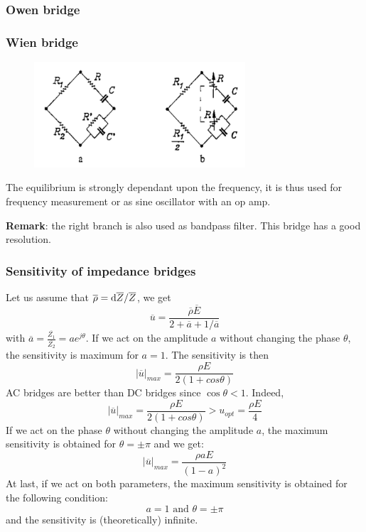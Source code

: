 \subsubsection{Owen bridge}

\subsubsection{Wien bridge}


\begin{minipage}[c]{0.45 \linewidth}
\begin{figure}[H]
    \centering
    \includegraphics[width = 0.7\textwidth]{L4/img/wien-bridge.PNG}
\end{figure}
\end{minipage}\hfill
\begin{minipage}[c]{0.45 \linewidth}
    The equilibrium is strongly dependant upon the frequency, it is thus used for frequency measurement or as sine oscillator with an op amp.
    
\textbf{Remark}: the right branch is also used as bandpass filter. This bridge has a good resolution.
\end{minipage}

\subsubsection{Sensitivity of impedance bridges}

Let us assume that $\overline{\rho} = \operatorname{d}\! \overline{Z}/\overline{Z}$, we get $$ \overline{u} = \frac{\overline{\rho} \overline{E}}{2 + \overline{a} + 1/ \overline{a}} $$
with $\overline{a} = \frac{\overline{Z_1}}{\overline{Z_2}} = a e^{j\theta}$.
If we act on the amplitude $a$ without changing the phase $\theta$,
the sensitivity is maximum for $a = 1$. The sensitivity is then $$|\overline{u}|_{max} = \frac{\rho E}{2(1+cos \theta)}$$
AC bridges are better than DC bridges since $\cos \theta < 1$. Indeed, 
$$|\overline{u}|_{max} = \frac{\rho E}{2(1+cos \theta)} > u_{opt} = \frac{\rho E}{4}  $$
If we act on the phase $\theta$ without changing the amplitude $a$, the
maximum sensitivity is obtained for $\theta = \pm \pi$ and we get:
$$ |\overline{u}|_{max} = \frac{\rho a E}{(1-a)^2} $$ 
At last, if we act on both parameters, the maximum sensitivity
is obtained for the following condition:
$$ a=1 \text{ and } \theta = \pm \pi  $$
and the sensitivity is (theoretically) infinite.

